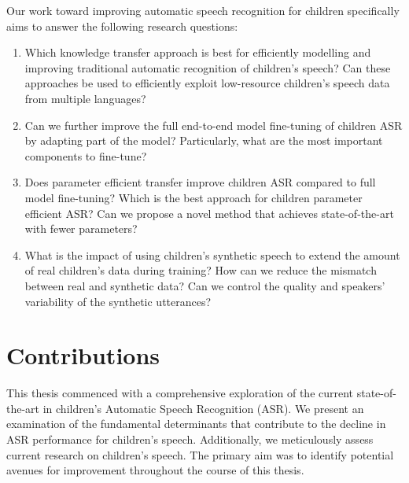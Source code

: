 Our work toward improving automatic speech recognition for children specifically aims to answer the following research questions:
\begin{enumerate} 
\item Which knowledge transfer approach is best for efficiently modelling and improving traditional automatic recognition of children's speech? Can these approaches be used to efficiently exploit low-resource children's speech data from multiple languages?
\item  Can we further improve the full end-to-end model fine-tuning of children \ac{ASR} by adapting part of the model? Particularly, what are the most important components to fine-tune?

\item Does parameter efficient transfer improve children \ac{ASR} compared to full model fine-tuning? Which is the best approach for children parameter efficient \ac{ASR}? Can we propose a novel method that achieves state-of-the-art with fewer parameters? 

\item What is the impact of using children's synthetic speech to extend the amount of real children's data during training? How can we reduce the mismatch between real and synthetic data? Can we control the quality and speakers’ variability of the synthetic utterances?
\end{enumerate}

\section{Contributions}
This thesis commenced with a comprehensive exploration of the current state-of-the-art in children's Automatic Speech Recognition (\ac{ASR}). We present an examination of the fundamental determinants that contribute to the decline in \ac{ASR} performance for children's speech. Additionally, we meticulously assess current research on children's speech. The primary aim was to identify potential avenues for improvement throughout the course of this thesis. 

